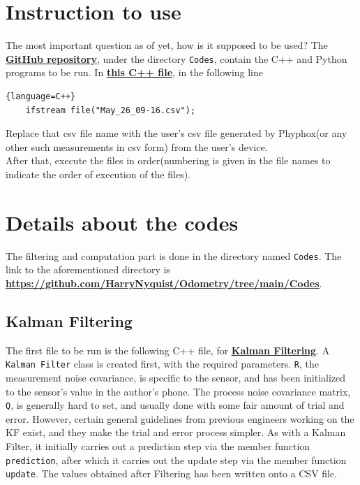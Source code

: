 \documentclass[oneside]{book}
\begin{document}
\chapter{Instruction to use}
The most important question as of yet, how is it supposed to be used? The \href{https://github.com/HarryNyquist/Odometry}{\underline{\textbf{GitHub repository}}}, under the directory \verb|Codes|, contain the C++ and Python programs to be run. In \href{https://github.com/HarryNyquist/Odometry/blob/main/Codes/1_KalmanFilter.cpp}{\underline{\textbf{this C++ file}}}, in the following line
\begin{lstlisting}{language=C++}
    ifstream file("May_26_09-16.csv");
\end{lstlisting}
Replace that csv file name with the user's csv file generated by Phyphox(or any other such measurements in csv form) from the user's device.\\
After that, execute the files in order(numbering is given in the file names to indicate the order of execution of the files). 

\chapter{Details about the codes}
The filtering and computation part is done in the directory named \verb|Codes|. The link to the aforementioned directory is \\ \href{https://github.com/HarryNyquist/Odometry/tree/main/Codes}{\underline{\textbf{https://github.com/HarryNyquist/Odometry/tree/main/Codes}}}.\\
\bigskip
\section{Kalman Filtering}
The first file to be run is the following C++ file, for \href{https://github.com/HarryNyquist/Odometry/blob/main/Codes/1_KalmanFilter.cpp}{\textbf{\underline{Kalman Filtering}}}. A \verb|Kalman Filter| class is created first, with the required parameters. \verb|R|, the measurement noise covariance, is specific to the sensor, and has been initialized to the sensor's value in the author's phone. The process noise covariance matrix, \verb|Q|, is generally hard to set, and usually done with some fair amount of trial and error. However, certain general guidelines from previous engineers working on the KF exist, and they make the trial and error process simpler. As with a Kalman Filter, it initially carries out a prediction step via the member function \verb|prediction|, after which it carries out the update step via the member function \verb|update|. The values obtained after Filtering has been written onto a CSV file.
\end{document}
